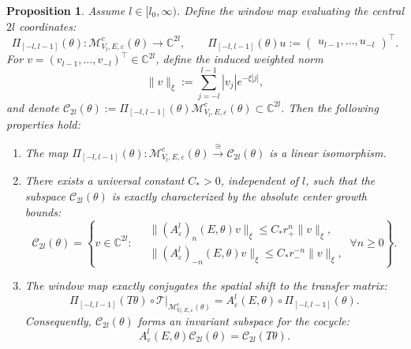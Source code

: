 \documentclass[reqno,11pt]{amsart}
\newtheorem{proposition}{Proposition}[section]
\newcommand{\C}{{\mathbb C}}
\begin{document}
\begin{proposition}\label{thm:bridge1}
Assume $l\in [l_0,\infty)$. Define the window map evaluating the central $2l$ coordinates:
$$
\Pi_{[-l,l-1]}(\theta) : \mathcal M_{V_l,E,\varepsilon}^c(\theta) \to \C^{2l},
\qquad
\Pi_{[-l,l-1]}(\theta)u := 
\begin{pmatrix}
u_{l-1}, \dots, u_{-l}
\end{pmatrix}^\top.
$$
For $v=(v_{l-1},\dots,v_{-l})^\top\in\C^{2l}$, define the induced weighted norm 
\begin{equation}\label{weight-norm}
\|v\|_{\xi}:=\sum_{j=-l}^{l-1}|v_j|e^{-\xi|j|},
\end{equation}
and denote  $\mathcal C_{2l}(\theta) := \Pi_{[-l,l-1]}(\theta)\mathcal M_{V_l,E,\varepsilon}^c(\theta) \subset \C^{2l}$. Then the following properties hold:

\begin{enumerate}
    \item The map 
    $
    \Pi_{[-l,l-1]}(\theta) : \mathcal M_{V_l,E,\varepsilon}^c(\theta) \xrightarrow{\cong} \mathcal C_{2l}(\theta)
    $ is a  linear isomorphism.

    \item There exists a universal constant $C_*>0$, independent of $l$, such that the subspace $\mathcal C_{2l}(\theta)$ is exactly characterized by the absolute center growth bounds:
    $$
    \mathcal C_{2l}(\theta)   =
    \left\{v\in\C^{2l}:\ 
    \begin{aligned}
        &\|(A_\varepsilon^l)_n(E,\theta)v\|_{\xi}\le C_* r_+^n\|v\|_{\xi},\\ 
    &\|(A_\varepsilon^l)_{-n}(E,\theta)v\|_{\xi}\le C_* r_-^{-n}\|v\|_{\xi},
    \end{aligned}\ 
    \forall n\ge0
    \right\}.
    $$
    
    \item  The window map exactly conjugates the spatial shift to the transfer matrix:
    $$
    \Pi_{[-l,l-1]}(T\theta)\circ \mathscr T\big|_{\mathcal M_{V_l,E,\varepsilon}^c(\theta)} =
    A_{\varepsilon}^{l}(E,\theta) \circ \Pi_{[-l,l-1]}(\theta).
    $$ 
    Consequently, $\mathcal C_{2l}(\theta)$ forms an invariant subspace for the cocycle:
    \begin{equation}\label{in-cocy}
         A_{\varepsilon}^{l}(E,\theta)\mathcal C_{2l}(\theta) = \mathcal C_{2l}(T\theta).
    \end{equation}
\end{enumerate}
\end{proposition}
\end{document}
